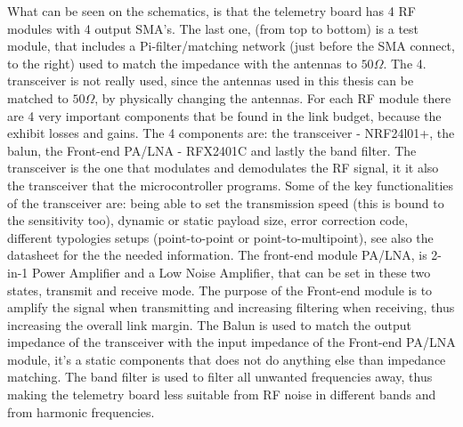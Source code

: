 What can be seen on the schematics, is that the telemetry board has 4 RF modules with 4 output SMA's. The last one, (from top to bottom) is a test module, that includes a Pi-filter/matching network (just before the SMA connect, to the right) used to match the impedance with the antennas to $50\Omega$. The 4. transceiver is not really used, since the antennas used in this thesis can be matched to $50\Omega$, by physically changing the antennas. For each RF module there are 4 very important components that be found in the link budget, because the exhibit losses and gains. The 4 components are: the transceiver - NRF24l01+\cite{nrf24l01+}, the balun\cite{Balun}, the Front-end PA/LNA - RFX2401C\cite{RFX2401C} and lastly the band filter\cite{BandFilter}. The transceiver is the one that modulates and demodulates the RF signal, it it also the transceiver that the microcontroller programs. Some of the key functionalities of the transceiver are: being able to set the transmission speed (this is bound to the sensitivity too), dynamic or static payload size, error correction code, different typologies setups (point-to-point or point-to-multipoint), see also the datasheet for the the needed information\cite{nrf24l01+}. The front-end module PA/LNA, is 2-in-1 Power Amplifier and a Low Noise Amplifier, that can be set in these two states, transmit and receive mode. The purpose of the Front-end module is to amplify the signal when transmitting and increasing filtering when receiving, thus increasing the overall link margin. The Balun is used to match the output impedance of the transceiver with the input impedance of the Front-end PA/LNA module, it's a static components that does not do anything else than impedance matching. The band filter is used to filter all unwanted frequencies away, thus making the telemetry board less suitable from RF noise in different bands and from harmonic frequencies.

